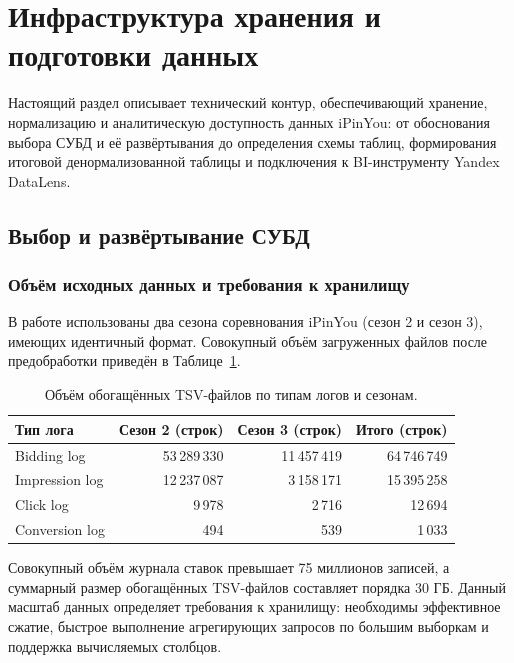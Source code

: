 \section{Инфраструктура хранения и подготовки данных}

Настоящий раздел описывает технический контур, обеспечивающий хранение, нормализацию и аналитическую доступность данных iPinYou: от обоснования выбора СУБД и её развёртывания до определения схемы таблиц, формирования итоговой денормализованной таблицы и подключения к BI-инструменту Yandex DataLens.

\subsection{Выбор и развёртывание СУБД}
\label{subsec:clickhouse_deploy}

\subsubsection*{Объём исходных данных и требования к хранилищу}

В работе использованы два сезона соревнования iPinYou (сезон 2 и сезон 3), имеющих идентичный формат. Совокупный объём загруженных файлов после предобработки приведён в Таблице~\ref{tab:file_sizes}.

\begin{table}[h!]
\small
  \begin{center}
    \caption{Объём обогащённых TSV-файлов по типам логов и сезонам.}
    \label{tab:file_sizes}
    \renewcommand{\arraystretch}{1.15}
    \begin{tabular}{l|r|r|r}
      \textbf{Тип лога} & \textbf{Сезон 2 (строк)} & \textbf{Сезон 3 (строк)} & \textbf{Итого (строк)} \\
      \hline
      Bidding log  & 53\,289\,330 & 11\,457\,419 & 64\,746\,749 \\
      Impression log & 12\,237\,087 &  3\,158\,171 & 15\,395\,258 \\
      Click log    &      9\,978  &      2\,716  &     12\,694  \\
      Conversion log &        494  &        539  &      1\,033  \\
    \end{tabular}
  \end{center}
\end{table}

Совокупный объём журнала ставок превышает 75 миллионов записей, а суммарный размер обогащённых TSV-файлов составляет порядка 30 ГБ. Данный масштаб данных определяет требования к хранилищу: необходимы эффективное сжатие, быстрое выполнение агрегирующих запросов по большим выборкам и поддержка вычисляемых столбцов.


